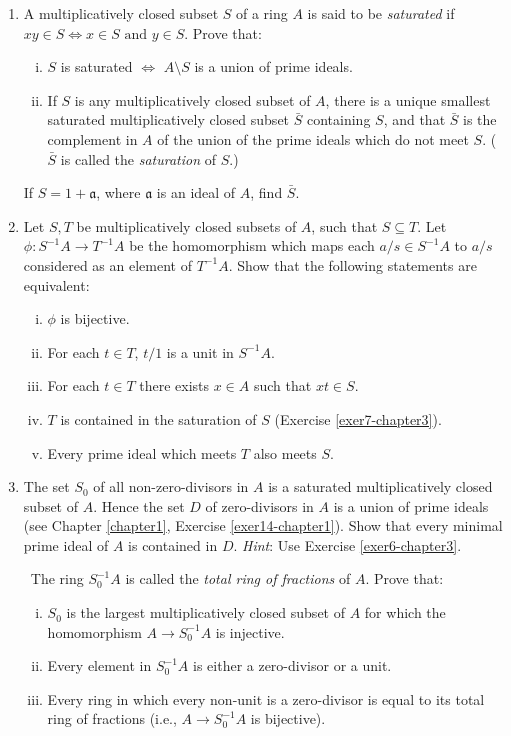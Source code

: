 \begin{enumerate}
    \item \label{exer7-chapter3}A multiplicatively closed subset $S$ of a ring $A$ is said to be \emph{saturated} if $xy \in S \iff x \in S \text{ and } y \in S$. Prove that:
    \begin{enumerate}[i)]
        \item $S$ is saturated $\iff$ $A \setminus S$ is a union of prime ideals.
        \item If $S$ is any multiplicatively closed subset of $A$, there is a unique smallest saturated multiplicatively closed subset $\bar{S}$ containing $S$, and that $\bar{S}$ is the complement in $A$ of the union of the prime ideals which do not meet $S$. ($\bar{S}$ is called the \emph{saturation} of $S$.)
    \end{enumerate}
    If $S = 1 + \mathfrak{a}$, where $\mathfrak{a}$ is an ideal of $A$, find $\bar{S}$.

    \item \label{exer8-chapter3} Let $S, T$ be multiplicatively closed subsets of $A$, such that $S \subseteq T$. Let $\phi \colon S^{-1}A \to T^{-1}A$ be the homomorphism which maps each $a/s \in S^{-1}A$ to $a/s$ considered as an element of $T^{-1}A$. Show that the following statements are equivalent:
    \begin{enumerate}[i)]
        \item $\phi$ is bijective.
        \item For each $t \in T$, $t/1$ is a unit in $S^{-1}A$.
        \item For each $t \in T$ there exists $x \in A$ such that $xt \in S$.
        \item $T$ is contained in the saturation of $S$ (Exercise \ref{exer7-chapter3}).
        \item Every prime ideal which meets $T$ also meets $S$.
    \end{enumerate}

    \item \label{exer9-chapter3} The set $S_0$ of all non-zero-divisors in $A$ is a saturated multiplicatively closed subset of $A$. Hence the set $D$ of zero-divisors in $A$ is a union of prime ideals (see Chapter \ref{chapter1}, Exercise \ref{exer14-chapter1}). Show that every minimal prime ideal of $A$ is contained in $D$. \textit{Hint}: Use Exercise \ref{exer6-chapter3}.
    
    \quad\, The ring $S_0^{-1}A$ is called the \emph{total ring of fractions} of $A$. Prove that:
    \begin{enumerate}[i)]
        \item $S_0$ is the largest multiplicatively closed subset of $A$ for which the homomorphism $A \to S_0^{-1}A$ is injective.
        \item Every element in $S_0^{-1}A$ is either a zero-divisor or a unit.
        \item Every ring in which every non-unit is a zero-divisor is equal to its total ring of fractions (i.e., $A \to S_0^{-1}A$ is bijective).
    \end{enumerate}


\end{enumerate}
